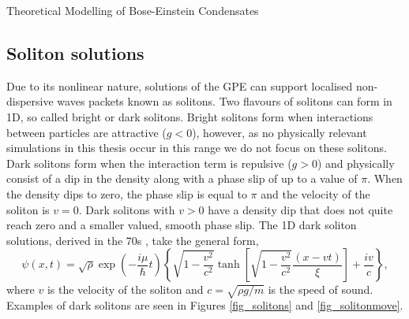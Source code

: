 \begin{chapter}{\label{cha:theoretical_model}Theoretical Modelling of Bose-Einstein Condensates}
	\subsection{\label{section:soliton} Soliton solutions}
	Due to its nonlinear nature, solutions of the GPE can support localised non-dispersive waves packets known as solitons. Two flavours of solitons can form in 1D, so called bright or dark solitons. Bright solitons form when interactions between particles are attractive ($g<0$), however, as no physically relevant simulations in this thesis occur in this range we do not focus on these solitons. Dark solitons form when the interaction term is repulsive ($g>0$) and physically consist of a dip in the density along with a phase slip of up to a value of $\pi$. When the density dips to zero, the phase slip is equal to $\pi$ and the velocity of the soliton is $v=0$. Dark solitons with $v>0$ have a density dip that does not quite reach zero and a smaller valued, smooth phase slip. The 1D dark soliton solutions, derived in the 70s \cite{zakharov72,zakharov73}, take the general form,
	\begin{equation}
		\psi(x,t) = \sqrt{\rho}\exp\left(-\frac{i\mu}{\hbar}t\right)\left\{ \sqrt{1-\frac{v^2}{c^2}} \tanh\left[ \sqrt{1-\frac{v^2}{c^2}}\frac{(x-vt)}{\xi} \right ] + \frac{iv}{c}  \right \} ,
	\end{equation}
	where $v$ is the velocity of the soliton and $c=\sqrt{\rho g/m}$ is the speed of sound. Examples of dark solitons are seen in Figures \ref{fig_solitons} and \ref{fig_solitonmove}.
	\begin{figure}[b]
	\centering
\end{figure}
\end{chapter}
